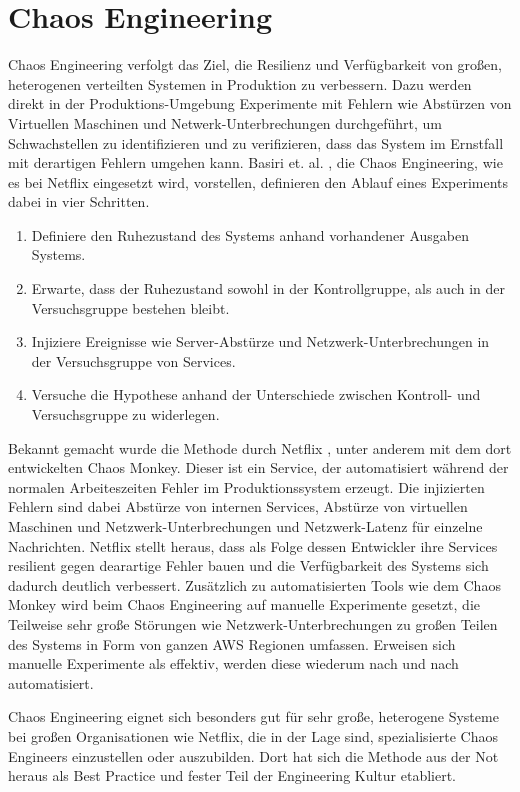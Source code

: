 \documentclass[12pt,a4paper]{report}
\begin{document}
\section{Chaos Engineering}
Chaos Engineering verfolgt das Ziel, die Resilienz und Verfügbarkeit von großen, heterogenen verteilten Systemen in Produktion zu
verbessern. Dazu werden direkt in der Produktions-Umgebung Experimente mit Fehlern wie Abstürzen von Virtuellen Maschinen und
Netwerk-Unterbrechungen durchgeführt, um Schwachstellen zu identifizieren und zu verifizieren, dass das System im Ernstfall mit
derartigen Fehlern umgehen kann. Basiri et. al. \cite{chaos_engineering}, die Chaos Engineering, wie es bei Netflix eingesetzt
wird, vorstellen, definieren den Ablauf eines Experiments dabei in vier Schritten.
\begin{enumerate}
	\item Definiere den Ruhezustand des Systems anhand vorhandener Ausgaben Systems.
	\item Erwarte, dass der Ruhezustand sowohl in der Kontrollgruppe, als auch in der Versuchsgruppe bestehen bleibt.
	\item Injiziere Ereignisse wie Server-Abstürze und Netzwerk-Unterbrechungen in der Versuchsgruppe von Services.
	\item Versuche die Hypothese anhand der Unterschiede zwischen Kontroll- und Versuchsgruppe zu widerlegen.
\end{enumerate}
Bekannt gemacht wurde die Methode durch Netflix \cite{abstracting_the_geniuses}, unter anderem mit dem dort entwickelten Chaos
Monkey. Dieser ist ein Service, der automatisiert während der normalen Arbeiteszeiten Fehler im Produktionssystem erzeugt. Die
injizierten Fehlern sind dabei Abstürze von internen Services, Abstürze von virtuellen Maschinen und Netzwerk-Unterbrechungen und
Netzwerk-Latenz für einzelne Nachrichten. Netflix stellt heraus, dass als Folge dessen Entwickler ihre Services resilient gegen
dearartige Fehler bauen und die Verfügbarkeit des Systems sich dadurch deutlich verbessert. Zusätzlich zu automatisierten Tools
wie dem Chaos Monkey wird beim Chaos Engineering auf manuelle Experimente gesetzt, die Teilweise sehr große Störungen wie
Netzwerk-Unterbrechungen zu großen Teilen des Systems in Form von ganzen AWS Regionen umfassen. Erweisen sich manuelle Experimente
als effektiv, werden diese wiederum nach und nach automatisiert. \cite{chaos_engineering}

Chaos Engineering eignet sich besonders gut für sehr große, heterogene Systeme bei großen Organisationen wie Netflix, die in der
Lage sind, spezialisierte Chaos Engineers einzustellen oder auszubilden. Dort hat sich die Methode aus der Not heraus als Best
Practice und fester Teil der Engineering Kultur etabliert. \cite{abstracting_the_geniuses}
\end{document}
